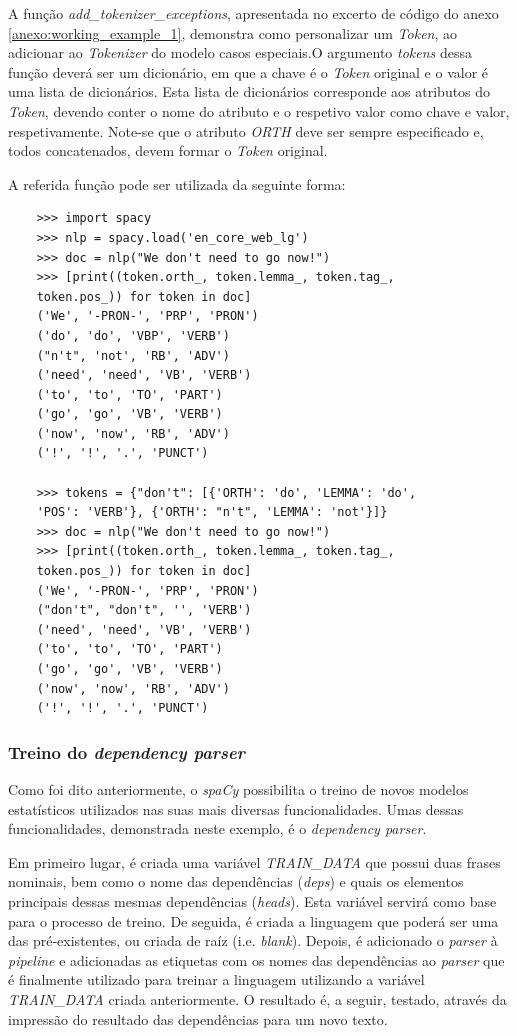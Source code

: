 \documentclass[12pt]{article}
\begin{document}
A função \textit{add\_tokenizer\_exceptions}, apresentada no excerto de código do anexo \ref{anexo:working_example_1}, demonstra como personalizar um \textit{Token}, ao adicionar ao \textit{Tokenizer} do modelo casos especiais.O argumento \textit{tokens} dessa função deverá ser um dicionário, em que a chave é o \textit{Token} original e o valor é uma lista de dicionários. Esta lista de dicionários corresponde aos atributos do \textit{Token}, devendo conter o nome do atributo e o respetivo valor como chave e valor, respetivamente. Note-se que o atributo \textit{ORTH} deve ser sempre especificado e, todos concatenados, devem formar o \textit{Token} original.


A referida função pode ser utilizada da seguinte forma:

\begin{verbatim}
	>>> import spacy
	>>> nlp = spacy.load('en_core_web_lg')
	>>> doc = nlp("We don't need to go now!")
	>>> [print((token.orth_, token.lemma_, token.tag_, 
	token.pos_)) for token in doc]
	('We', '-PRON-', 'PRP', 'PRON')
	('do', 'do', 'VBP', 'VERB')
	("n't", 'not', 'RB', 'ADV')
	('need', 'need', 'VB', 'VERB')
	('to', 'to', 'TO', 'PART')
	('go', 'go', 'VB', 'VERB')
	('now', 'now', 'RB', 'ADV')
	('!', '!', '.', 'PUNCT')

	>>> tokens = {"don't": [{'ORTH': 'do', 'LEMMA': 'do',
	'POS': 'VERB'}, {'ORTH': "n't", 'LEMMA': 'not'}]}
	>>> doc = nlp("We don't need to go now!")
	>>> [print((token.orth_, token.lemma_, token.tag_,
	token.pos_)) for token in doc]
	('We', '-PRON-', 'PRP', 'PRON')
	("don't", "don't", '', 'VERB')
	('need', 'need', 'VB', 'VERB')
	('to', 'to', 'TO', 'PART')
	('go', 'go', 'VB', 'VERB')
	('now', 'now', 'RB', 'ADV')
	('!', '!', '.', 'PUNCT')
\end{verbatim}


\subsubsection{Treino do \textit{dependency parser}}

Como foi dito anteriormente, o \textit{spaCy} possibilita o treino de novos modelos estatísticos utilizados nas suas mais diversas funcionalidades. Umas dessas funcionalidades, demonstrada neste exemplo, é o \textit{dependency parser}.

Em primeiro lugar, é criada uma variável \textit{TRAIN\_DATA} que possui duas frases nominais, bem como o nome das dependências (\textit{deps}) e quais os elementos principais dessas mesmas dependências (\textit{heads}). Esta variável servirá como base para o processo de treino. De seguida, é criada a linguagem que poderá ser uma das pré-existentes, ou criada de raíz (i.e. \textit{blank}). Depois, é adicionado o \textit{parser} à \textit{pipeline} e adicionadas as etiquetas com os nomes das dependências ao \textit{parser} que é finalmente utilizado para treinar a linguagem utilizando a variável \textit{TRAIN\_DATA} criada anteriormente. O resultado é, a seguir, testado, através da impressão do resultado das dependências para um novo texto.
\end{document}
